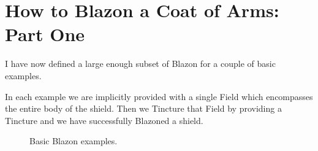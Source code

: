 \section{How to Blazon a Coat of Arms: Part One}

I have now defined a large enough subset of Blazon for a couple of basic examples.  

In each example we are implicitly provided with a single Field which encompasses the entire body of the shield. Then we Tincture that Field by providing a Tincture and we have successfully Blazoned a shield.  

\begin{figure}[H]
\hfill
{}
\hfill
{}
\hfill
{}
\hfill
\caption{Basic Blazon examples.}
\label{Basic examples}
\end{figure}

